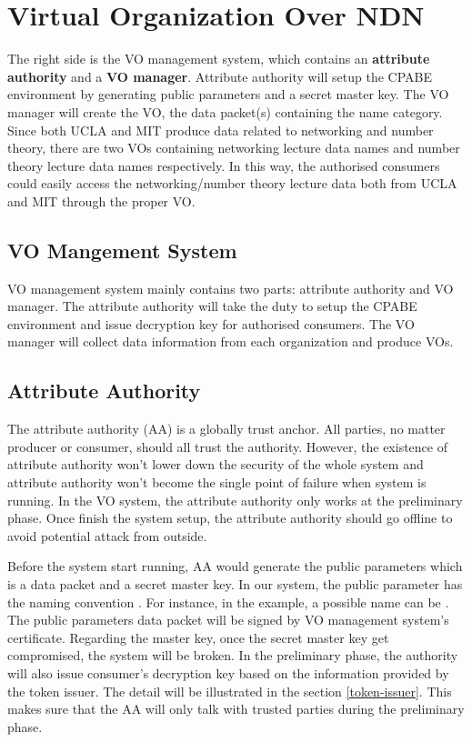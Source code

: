 \section{Virtual Organization Over NDN}

The right side is the VO management system, which contains an \textbf{attribute authority} and a \textbf{VO manager}.
Attribute authority will setup the CPABE environment by generating public parameters and a secret master key.
The VO manager will create the VO, the data packet(s) containing the name category.
Since both UCLA and MIT produce data related to networking and number theory, there are two VOs containing networking lecture data names and number theory lecture data names respectively.
In this way, the authorised consumers could easily access the networking/number theory lecture data both from UCLA and MIT through the proper VO.

\subsection{VO Mangement System}

VO management system mainly contains two parts: attribute authority and VO manager.
The attribute authority will take the duty to setup the CPABE environment and issue decryption key for authorised consumers.
The VO manager will collect data information from each organization and produce VOs.

\subsection{Attribute Authority}
The attribute authority (AA) is a globally trust anchor.
All parties, no matter producer or consumer, should all trust the authority.
However, the existence of attribute authority won't lower down the security of the whole system and attribute authority won't become the single point of failure when system is running.
In the VO system, the attribute authority only works at the preliminary phase.
Once finish the system setup, the attribute authority should go offline to avoid potential attack from outside.

Before the system start running, AA would generate the public parameters which is a data packet and a secret master key.
In our system, the public parameter has the naming convention .
For instance, in the example, a possible name can be .
The public parameters data packet will be signed by VO management system's certificate.
Regarding the master key, once the secret master key get compromised, the system will be broken.
In the preliminary phase, the authority will also issue consumer's decryption key based on the information provided by the token issuer.
The detail will be illustrated in the section \ref{token-issuer}.
This makes sure that the AA will only talk with trusted parties during the preliminary phase.

